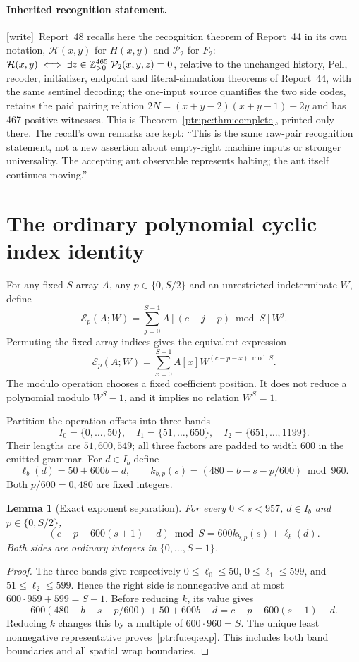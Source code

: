 \documentclass[11pt,letterpaper]{article}
\newtheorem{lemma}[theorem]{Lemma}
\theoremstyle{definition}\newtheorem{definition}[theorem]{Definition}
\theoremstyle{remark}\newtheorem{remark}[theorem]{Remark}
\newcommand{\E}{\mathcal E}\newcommand{\calQ}{\mathcal Q}\newcommand{\calL}{\mathcal L}
\newcommand{\wtag}{\textup{[write]}}
\begin{document}
\paragraph{Inherited recognition statement.}
\wtag\ Report~48 recalls here the recognition theorem of Report~44 in its own
notation, $\mathcal H(x,y)$ for $H(x,y)$ and $\mathcal P_2$ for $F_2$:
$\mathcal H(x,y)\iff\exists z\in\mathbb Z_{>0}^{465}\;\mathcal P_2(x,y,z)=0$, relative to
the unchanged history, Pell, recoder, initializer, endpoint and
literal-simulation theorems of Report~44, with the same sentinel decoding;
the one-input source quantifies the two side codes, retains the paid pairing
relation $2N=(x+y-2)(x+y-1)+2y$ and has 467 positive witnesses. This is
Theorem~\ref{ptr:pc:thm:complete}, printed only there. The recall's own
remarks are kept: ``This is the same raw-pair recognition statement, not a
new assertion about empty-right machine inputs or stronger universality. The
accepting ant observable represents halting; the ant itself continues
moving.''

\section{The ordinary polynomial cyclic index identity}\label{ptr:fu:sec:cyclic}
For any fixed $S$-array $A$, any $p\in\{0,S/2\}$ and an unrestricted indeterminate $W$, define
\begin{equation}\label{ptr:fu:eq:E}
 \E_p(A;W)=\sum_{j=0}^{S-1}A[(c-j-p)\bmod S]W^j.
\end{equation}
Permuting the fixed array indices gives the equivalent expression
\[
 \E_p(A;W)=\sum_{x=0}^{S-1}A[x]W^{(c-p-x)\bmod S}.
\]
The modulo operation chooses a fixed coefficient position. It does not reduce a polynomial modulo $W^S-1$, and it implies no relation $W^S=1$.

Partition the operation offsets into three bands
\[
 I_0=\{0,\ldots,50\},\quad I_1=\{51,\ldots,650\},\quad
 I_2=\{651,\ldots,1199\}.
\]
Their lengths are $51,600,549$; all three factors are padded to width 600 in the emitted grammar. For $d\in I_b$ define
\[
 \ell_b(d)=50+600b-d,\qquad
 k_{b,p}(s)=(480-b-s-p/600)\bmod960.
\]
Both $p/600=0,480$ are fixed integers.

\begin{lemma}[Exact exponent separation]\label{ptr:fu:lem:exp}
For every $0\le s<957$, $d\in I_b$ and $p\in\{0,S/2\}$,
\begin{equation}\label{ptr:fu:eq:exp}
 (c-p-600(s+1)-d)\bmod S=600k_{b,p}(s)+\ell_b(d).
\end{equation}
Both sides are ordinary integers in $\{0,\ldots,S-1\}$.
\end{lemma}
\begin{proof}
The three bands give respectively $0\le\ell_0\le50$, $0\le\ell_1\le599$, and $51\le\ell_2\le599$. Hence the right side is nonnegative and at most $600\cdot959+599=S-1$. Before reducing $k$, its value gives
\[
 600(480-b-s-p/600)+50+600b-d
 =c-p-600(s+1)-d.
\]
Reducing $k$ changes this by a multiple of $600\cdot960=S$. The unique least nonnegative representative proves~\eqref{ptr:fu:eq:exp}. This includes both band boundaries and all spatial wrap boundaries.
\end{proof}
\end{document}
